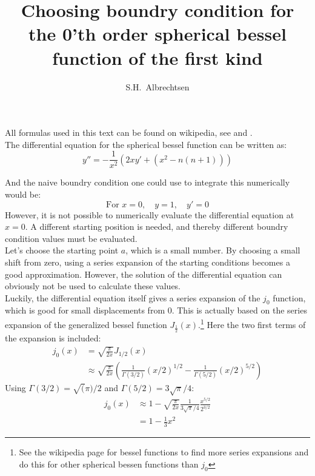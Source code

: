 \documentclass[twocolumn]{article}
\title{\vspace{-3.5cm}Choosing boundry condition for the 0'th order spherical bessel function of the first kind}
\author{S.H.~Albrechtsen}
\begin{document}
\maketitle
All formulas used in this text can be found on wikipedia, see \cite{wikiBesselFunction} and \cite{wikiGammaFunction}.\\

The differential equation for the spherical bessel function can be written as:
\begin{equation}
y'' = -\frac{1}{x^2}(2x y' + (x^2 - n(n+1)))
\end{equation}

And the naive boundry condition one could use to integrate this numerically would be:
\begin{equation}
\textrm{For } x = 0, \quad y = 1,\quad y'=0
\end{equation}
However, it is not possible to numerically evaluate the differential equation at $x=0$. A different starting position is needed, and thereby different boundry condition values must be evaluated.\\

Let's choose the starting point $a$, which is a small number. By choosing a small shift from zero, using a series expansion of the starting conditions becomes a good approximation. However, the solution of the differential equation can obviously not be used to calculate these values.\\

Luckily, the differential equation itself gives a series expansion of the $j_0$ function, which is good for small displacements from 0. This is actually based on the series expansion of the generalized bessel function $J_{\frac{1}{2}}(x)$.\footnote{See the wikipedia page for bessel functions to find more series expansions and do this for other spherical bessen functions than $j_0$} Here the two first terms of the expansion is included:
\begin{align}
j_0(x) & = \sqrt{\frac{\pi}{2x}}J_{1/2}(x)\\
& \approx \sqrt{\frac{\pi}{2x}} \left( \frac{1}{\Gamma(3/2)}(x/2)^{1/2} - \frac{1}{\Gamma(5/2)}(x/2)^{5/2}  \right)
\end{align}
Using $\Gamma(3/2) = \sqrt(\pi)/2$ and $\Gamma(5/2) = 3\sqrt{\pi}/4$:
\begin{align}
j_0(x) & \approx 1 - \sqrt{\frac{\pi}{2x}}\frac{1}{3\sqrt{\pi}/4}\frac{x^{5/2}}{2^{3/2}}\\
& = 1-\frac{1}{3}x^2
\end{align}
\end{document}
